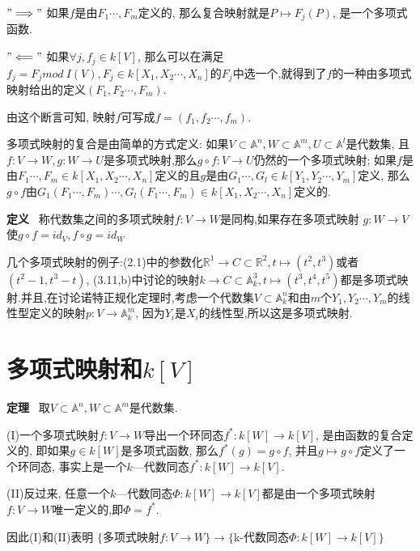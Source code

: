 \documentclass[UTF8]{book}
\begin{document}
		$"\Longrightarrow"$
		如果$ f $是由$F_{1}\cdots,F_{m}$定义的, 那么复合映射就是$P\mapsto F_{j}(P)$, 是一个多项式函数.

		$"\Longleftarrow"$
		如果$\forall  j, f_{j}\in k[V] $, 那么可以在满足$f_{j}=F_{j} mod\ I(V), F_{j}\in k[X_{1},X_{2}\cdots,X_{n}]$的$F_{j}$中选一个,就得到了$ f $的一种由多项式映射给出的定义$(F_{1},F_{2}\cdots,F_{m})$.

		由这个断言可知, 映射$ f $可写成$f=(f_{1},f_{2}\cdots,f_{m})$.

		多项式映射的复合是由简单的方式定义: 如果$V\subset \mathbb{A}^{n}, W\subset \mathbb{A}^{m}, U\subset \mathbb{A}^{l}$是代数集, 且$ f:V\rightarrow W, g:W \rightarrow U  $是多项式映射,那么$g\circ f :V \rightarrow U$仍然的一个多项式映射; 如果$ f $是由$F_{1}\cdots,F_{m}\in k[X_{1},X_{2}\cdots,X_{n}]$定义的且$ g $是由$G_{1}\cdots,G_{l}\in k[Y_{1},Y_{2}\cdots,Y_{m}]$定义, 那么$g\circ f$由$G_{1}(F_{1}\cdots,F_{m})\cdots,G_{l}(F_{1}\cdots,F_{m})\in k[X_{1},X_{2}\cdots,X_{n}]$定义的.

		\textbf{定义} \ 称代数集之间的多项式映射$ f:V \rightarrow W $是同构,如果存在多项式映射 $ g:W \rightarrow V $使$g\circ f=id_{V}, f\circ g=id_{W}$

		几个多项式映射的例子:(2.1)中的参数化$\mathbb{R}^{1}\rightarrow C\subset \mathbb{R}^{2}, t\mapsto (t^{2},t^{3})$或者$(t^{2}-1,t^{3}-t)$, (3.11,b)中讨论的映射$k\rightarrow C\subset \mathbb{A}^{3}_{k}, t\mapsto (t^{3},t^{4},t^{5})$都是多项式映射.并且,在讨论诺特正规化定理时,考虑一个代数集$V\subset \mathbb{A}^{n}_{k}$和由$ m $个$Y_{1},Y_{2}\cdots,Y_{m}$的线性型定义的映射$p:V\rightarrow \mathbb{A}^{m}_{k}$, 因为$Y_{i}$是$X_{i}$的线性型,所以这是多项式映射.

	\section{多项式映射和$ k[V] $}
		\textbf{定理} \ 取$V\subset \mathbb{A}^{n},W\subset \mathbb{A}^{m}$是代数集.

		(I)一个多项式映射$ f:V \rightarrow W $导出一个环同态$f^{*}:k[W]\rightarrow k[V]$, 是由函数的复合定义的, 即如果$g\in k[W]$是多项式函数, 那么$f^{*}(g)=g\circ f$, 并且$g\mapsto g\circ f$定义了一个环同态, 事实上是一个$ k $—代数同态$f^{*}:k[W]\rightarrow k[V]$.

		(II)反过来, 任意一个$ k $—代数同态$\Phi:k[W]\rightarrow k[V]$都是由一个多项式映射$ f:V \rightarrow W $唯一定义的,即$\Phi=f^{*}$.

		因此(I)和(II)表明
		\center  $\{$多项式映射$f:V \rightarrow W \}\longrightarrow $$\{$k-代数同态$\Phi:k[W]\rightarrow k[V]\}$
\end{document}
